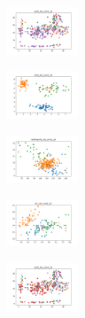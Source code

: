 \begin{figure}[H]
\begin{subfigure}
    \end{subfigure}
    \hfill
    \begin{subfigure}
        \centering
        \includegraphics[width=0.234\textwidth]{img/bl/ecoli_set_const_10_589741062_clust.png}
    \end{subfigure}
    \hfill
    \begin{subfigure}
        \centering
        \includegraphics[width=0.234\textwidth]{img/bl/rand_set_const_10_589741062_clust.png}
    \end{subfigure}
    \hfill
    \begin{subfigure}
        \centering
        \includegraphics[width=0.234\textwidth]{img/bl/newthyroid_set_const_10_589741062_clust.png}
    \end{subfigure}
    \hfill
    \begin{subfigure}
        \centering
        \includegraphics[width=0.234\textwidth]{img/bl/iris_set_const_10_277451237_clust.png}
    \end{subfigure}
    \hfill
    \begin{subfigure}
        \centering
        \includegraphics[width=0.234\textwidth]{img/bl/ecoli_set_const_10_277451237_clust.png}
    \end{subfigure}
    \hfill
    \begin{subfigure}

\end{subfigure}
\end{figure}
